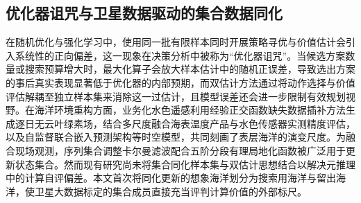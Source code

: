 \subsection{优化器诅咒与卫星数据驱动的集合数据同化}

在随机优化与强化学习中，使用同一批有限样本同时开展策略寻优与价值估计会引入系统性的正向偏差，这一现象在决策分析中被称为“优化器诅咒”\cite{smith2006curse}。当候选方案数量或搜索预算增大时，最大化算子会放大样本估计中的随机正误差，导致选出方案的事后真实表现显著低于优化器的内部预期，而双估计方法通过将动作选择与价值评估解耦至独立样本集来消除这一过估计\cite{vanhasselt2010double}，且模型误差还会进一步限制有效规划视野\cite{jiang2015horizon}。在海洋环境重构方面，业务化水色遥感利用经验正交函数缺失数据插补方法生成逐日无云叶绿素场\cite{beckers2003dineof}，结合多尺度融合海表温度产品\cite{chin2017mur}与水色传感器实测精度评估\cite{ye2021cocts}，以及自监督联合嵌入预测架构等时空模型\cite{assran2025vjepa2}，共同刻画了表层海洋的演变尺度。为融合现场观测，序列集合调整卡尔曼滤波\cite{anderson2001eakf}配合五阶分段有理局地化函数\cite{gaspari1999correlation}被广泛用于更新状态集合。然而现有研究尚未将集合同化样本集与双估计思想结合以解决元推理中的计算自评偏差。本文首次将同化更新的想象海洋划分为搜索用海洋与留出海洋，使卫星大数据标定的集合成员直接充当评判计算价值的外部标尺。
